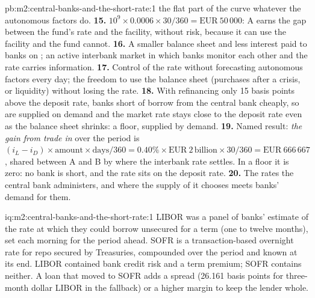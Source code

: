 \begin{solution}{pb:m2:central-banks-and-the-short-rate:1}
the flat part of the curve whatever the autonomous factors do.
\textbf{15.} $10^9 \times 0.0006 \times 30/360 = \text{EUR}~50\,000$: A earns
the gap between the fund's rate and the facility, without risk, because it
can use the facility and the fund cannot.
\textbf{16.} A smaller balance sheet and less interest paid to banks on
; an active interbank market in which banks monitor each other and
the rate carries information.
\textbf{17.} Control of the rate without forecasting autonomous factors every
day; the freedom to use the balance sheet (purchases after a crisis, or
liquidity) without losing the rate.
\textbf{18.} With refinancing only 15 basis points above the deposit rate,
banks short of  borrow from the central bank cheaply, so  are
supplied on demand and the market rate stays close to the deposit rate even
as the balance sheet shrinks: a floor, supplied by demand.
\textbf{19.} Named result: \emph{the gain from trade in } over the
period is $(i_L - i_D) \times \text{amount} \times \text{days}/360 = 0.40\%
\times \text{EUR}~2\,\text{billion} \times 30/360 = \text{EUR}~666\,667$,
shared between A and B by where the interbank rate settles. In a floor it
is zero: no bank is short, and the rate sits on the deposit rate.
\textbf{20.} The rates the central bank administers, and where the supply of
 it chooses meets banks' demand for them.
\end{solution}

\begin{solution}{iq:m2:central-banks-and-the-short-rate:1}
LIBOR was a panel of banks' estimate of the rate at which they could borrow
unsecured for a term (one to twelve months), set each morning for the period
ahead. SOFR is a transaction-based overnight rate for repo secured by
Treasuries, compounded over the period and known at its end. LIBOR contained
bank credit risk and a term premium; SOFR contains neither. A loan that moved
to SOFR adds a spread (26.161 basis points for three-month dollar LIBOR in
the fallback) or a higher margin to keep the lender whole.
\end{solution}

